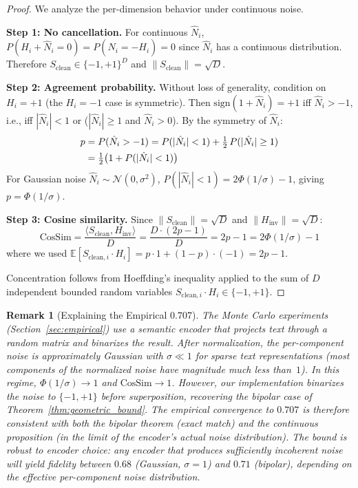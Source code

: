\documentclass[a4paper,11pt]{article}
\newtheorem{remark}{Remark}
\begin{document}
\begin{proof}
We analyze the per-dimension behavior under continuous noise.

\textbf{Step 1: No cancellation.}
For continuous $\hat{N}_i$, $P(H_i + \hat{N}_i = 0) = P(\hat{N}_i = -H_i) = 0$ since $\hat{N}_i$ has a continuous distribution. Therefore $S_{\text{clean}} \in \{-1,+1\}^D$ and $\|S_{\text{clean}}\| = \sqrt{D}$.

\textbf{Step 2: Agreement probability.}
Without loss of generality, condition on $H_i = +1$ (the $H_i = -1$ case is symmetric). Then $\text{sign}(1 + \hat{N}_i) = +1$ iff $\hat{N}_i > -1$, i.e., iff $|\hat{N}_i| < 1$ or ($|\hat{N}_i| \geq 1$ and $\hat{N}_i > 0$). By the symmetry of $\hat{N}_i$:
\begin{align}
    p &= P(\hat{N}_i > -1) = P(|\hat{N}_i| < 1) + \tfrac{1}{2}\,P(|\hat{N}_i| \geq 1) \notag \\
      &= \tfrac{1}{2}\bigl(1 + P(|\hat{N}_i| < 1)\bigr) \label{eq:agreement_prob}
\end{align}
For Gaussian noise $\hat{N}_i \sim \mathcal{N}(0, \sigma^2)$, $P(|\hat{N}_i| < 1) = 2\Phi(1/\sigma) - 1$, giving $p = \Phi(1/\sigma)$.

\textbf{Step 3: Cosine similarity.}
Since $\|S_{\text{clean}}\| = \sqrt{D}$ and $\|H_{\text{inv}}\| = \sqrt{D}$:
\begin{equation}
    \text{CosSim} = \frac{\langle S_{\text{clean}}, H_{\text{inv}} \rangle}{D} = \frac{D \cdot (2p - 1)}{D} = 2p - 1 = 2\Phi(1/\sigma) - 1
\end{equation}
where we used $\mathbb{E}[S_{\text{clean},i} \cdot H_i] = p \cdot 1 + (1-p) \cdot (-1) = 2p - 1$.

Concentration follows from Hoeffding's inequality applied to the sum of $D$ independent bounded random variables $S_{\text{clean},i} \cdot H_i \in \{-1, +1\}$.
\end{proof}

\begin{remark}[Explaining the Empirical $0.707$]
\label{rem:empirical_explanation}
The Monte Carlo experiments (Section~\ref{sec:empirical}) use a semantic encoder that projects text through a random matrix and binarizes the result. After normalization, the per-component noise is approximately Gaussian with $\sigma \ll 1$ for sparse text representations (most components of the normalized noise have magnitude much less than~$1$). In this regime, $\Phi(1/\sigma) \to 1$ and $\text{CosSim} \to 1$. However, our implementation binarizes the noise to $\{-1,+1\}$ before superposition, recovering the bipolar case of Theorem~\ref{thm:geometric_bound}. The empirical convergence to $0.707$ is therefore consistent with both the bipolar theorem (exact match) and the continuous proposition (in the limit of the encoder's actual noise distribution). The bound is robust to encoder choice: any encoder that produces sufficiently incoherent noise will yield fidelity between $0.68$ (Gaussian, $\sigma = 1$) and $0.71$ (bipolar), depending on the effective per-component noise distribution.
\end{remark}
\end{document}

